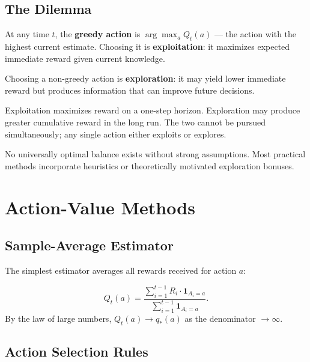 \documentclass[11pt,a4paper]{article}
\theoremstyle{definition}
\theoremstyle{plain}
\theoremstyle{remark}
\begin{document}
\subsection{The Dilemma}

At any time $t$, the \textbf{greedy action} is $\arg\max_a Q_t(a)$ — the action with the highest current estimate. Choosing it is \textbf{exploitation}: it maximizes expected immediate reward given current knowledge.

Choosing a non-greedy action is \textbf{exploration}: it may yield lower immediate reward but produces information that can improve future decisions.

\begin{tcolorbox}[colback=orange!5!white,colframe=orange!75!black,title=\textbf{Exploration-Exploitation Dilemma}]
Exploitation maximizes reward on a one-step horizon. Exploration may produce greater cumulative reward in the long run. The two cannot be pursued simultaneously; any single action either exploits or explores.
\end{tcolorbox}

No universally optimal balance exists without strong assumptions. Most practical methods incorporate heuristics or theoretically motivated exploration bonuses.

\section{Action-Value Methods}

\subsection{Sample-Average Estimator}

The simplest estimator averages all rewards received for action $a$:
\begin{tcolorbox}[colback=blue!5!white,colframe=blue!75!black,title=\textbf{Sample-Average Method}]
\[
    Q_t(a) = \frac{\displaystyle\sum_{i=1}^{t-1} R_i \cdot \mathbf{1}_{A_i = a}}{\displaystyle\sum_{i=1}^{t-1} \mathbf{1}_{A_i = a}}.
\]
By the law of large numbers, $Q_t(a) \to q_*(a)$ as the denominator $\to \infty$.
\end{tcolorbox}

\subsection{Action Selection Rules}
\end{document}
